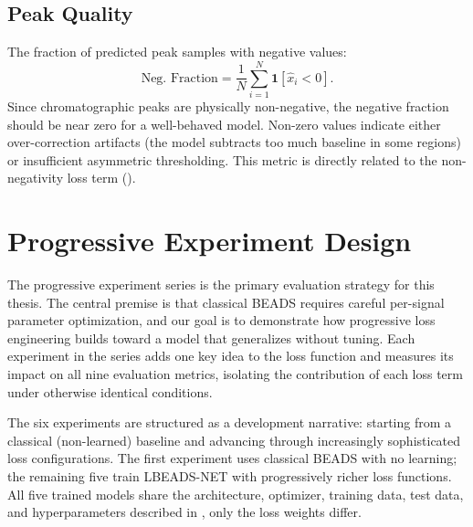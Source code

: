 \subsection{Peak Quality}
\label{sec:exp_metrics_quality}

 The fraction of predicted peak samples with negative values:
\begin{equation}
    \text{Neg.\ Fraction} = \frac{1}{N} \sum_{i=1}^{N} \mathbf{1}[\hat{x}_i < 0].
    \label{eq:neg_fraction}
\end{equation}
Since chromatographic peaks are physically non-negative, the negative fraction should be near zero for a well-behaved model. Non-zero values indicate either over-correction artifacts (the model subtracts too much baseline in some regions) or insufficient asymmetric thresholding. This metric is directly related to the non-negativity loss term ().


\section{Progressive Experiment Design}
\label{sec:exp_progressive}

The progressive experiment series is the primary evaluation strategy for this thesis. The central premise is that classical BEADS requires careful per-signal parameter optimization, and our goal is to demonstrate how progressive loss engineering builds toward a model that generalizes without tuning. Each experiment in the series adds one key idea to the loss function and measures its impact on all nine evaluation metrics, isolating the contribution of each loss term under otherwise identical conditions.

The six experiments are structured as a development narrative: starting from a classical (non-learned) baseline and advancing through increasingly sophisticated loss configurations. The first experiment uses classical BEADS with no learning; the remaining five train LBEADS-NET with progressively richer loss functions. All five trained models share the architecture, optimizer, training data, test data, and hyperparameters described in , only the loss weights differ.


